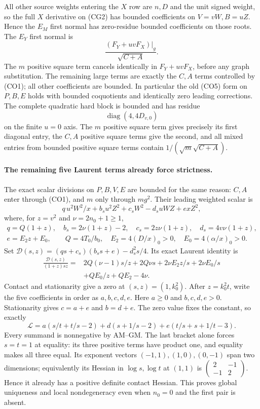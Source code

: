 All other source weights entering the $X$ row are $n,D$ and the
unit signed weight, so the full $X$ derivative on (CG2) has bounded
coefficients on $V=vW,B=uZ$.  Hence the $E_M$ first normal has
zero-residue bounded coefficients on those roots.  The $E_Y$ first
normal is
\[
       \frac{(F_Y+uvF_X)|_g}{\sqrt{C+A}}.               \tag{CG4}
\]
The $m$ positive square term cancels identically in $F_Y+uvF_X$, before any graph
substitution.  The remaining large terms are exactly the $C,A$
terms controlled by (CO1); all other coefficients are bounded.
In particular the old (CO5) form on $P,B,E$ holds with bounded
coquotients and identically zero leading corrections.
The complete quadratic hard block is bounded and has residue
\[
                         \operatorname{diag}(4,4D_{v,0})  \tag{CG5}
\]
on the finite $u=0$ axis.  The $m$ positive square term gives precisely its first
diagonal entry, the $C,A$ positive square terms give the second, and all mixed
entries from bounded positive square terms contain $1/(\sqrt m\sqrt{C+A})$.

\paragraph{The remaining five Laurent terms already force strictness.}
The exact scalar divisions on $P,B,V,E$ are bounded for the same
reason: $C,A$ enter through (CO1), and $m$ only through $mg^2$.
Their leading weighted scalar is
\[
 q\,u^2W^2/x+b_su^2Z^2+c_sW^2-d_suWZ+exZ^2,
\]
where, for $z=v^2$ and $\nu=2n_0+1\geq1$,
\[
 \begin{gathered}
 q=Q(1+z),\quad b_s=2\nu(1+z)-2,\quad
 c_s=2z\nu(1+z),\quad d_s=4v\nu(1+z),\\
 e=E_2z+E_0,\qquad Q=4T_0/b_0,
 \quad E_2=4(D/x)_0>0,\quad E_0=4(\alpha/x)_0>0.
 \end{gathered}                                         \tag{CG6}
\]
Set $\mathcal D(s,z)=(qs+c_s)(b_ss+e)-d_s^2s/4$.
Its exact Laurent identity is
\begin{align*}
 \frac{\mathcal D(s,z)}{(1+z)sz}={}&
 2Q(\nu-1)s/z+2Q\nu s
 +2\nu E_2z/s+2\nu E_0/s\\
 &+QE_0/z+QE_2-4\nu.                                  \tag{CG7}
\end{align*}
Contact and stationarity give a zero at $(s,z)=(1,k_0^2)$.
After $z=k_0^2t$, write the five coefficients in order as
$a,b,c,d,e$.  Here $a\geq0$ and $b,c,d,e>0$.  Stationarity gives
$c=a+e$ and $b=d+e$.  The zero value fixes the constant, so exactly
\[
 \mathcal L=
 a(s/t+t/s-2)+d(s+1/s-2)+e(t/s+s+1/t-3).                 \tag{CG8}
\]
Every summand is nonnegative by AM--GM.  The last bracket alone
forces $s=t=1$ at equality: its three positive terms have product
one, and equality makes all three equal.  Its exponent vectors
$(-1,1),(1,0),(0,-1)$ span two dimensions; equivalently its Hessian
in $\log s,\log t$ at $(1,1)$ is
$\left(\begin{smallmatrix}2&-1\\-1&2\end{smallmatrix}\right)$.
Hence it already has a positive definite contact Hessian.
This proves global uniqueness and local nondegeneracy even when
$n_0=0$ and the first pair is absent.

